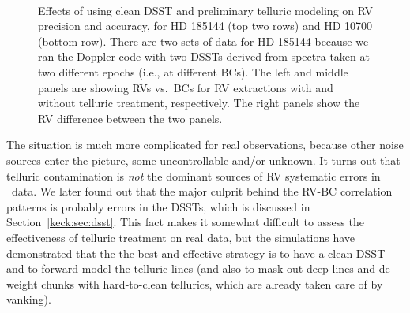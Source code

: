 \begin{figure}
\
\
\
\caption{Effects of using clean DSST and preliminary telluric modeling
  on RV precision and accuracy, for HD 185144 (top two rows) and HD
  10700 (bottom row). There are two sets of data for HD 185144 because
  we ran the Doppler code with two DSSTs derived from spectra taken at
  two different epochs (i.e., at different BCs). The left and middle
  panels are showing RVs vs.\ BCs for RV extractions with and without
  telluric treatment, respectively. The right panels show the RV
  difference between the two panels.
\label{telluric:fig:real}}
\end{figure}


The situation is much more complicated for real observations, because
other noise sources enter the picture, some uncontrollable and/or
unknown. It turns out that telluric contamination is {\em not} the
dominant sources of RV systematic errors in \keck\ data. We later
found out that the major culprit behind the RV-BC correlation patterns
is probably errors in the DSSTs, which is discussed in
Section~\ref{keck:sec:dsst}. This fact makes it somewhat difficult to
assess the effectiveness of telluric treatment on real data, but the
simulations have demonstrated that the the best and effective strategy
is to have a clean DSST and to forward model the telluric lines (and
also to mask out deep lines and de-weight chunks with hard-to-clean
tellurics, which are already taken care of by vanking).

